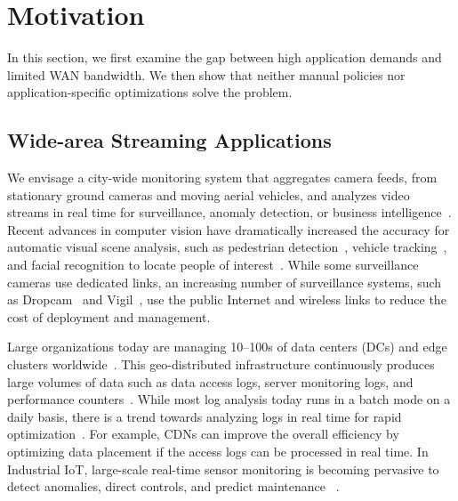 \section{Motivation}
\label{sec:motivation}

In this section, we first examine the gap between high application demands and
limited WAN bandwidth. We then show that neither manual policies nor
application-specific optimizations solve the problem.

\subsection{Wide-area Streaming Applications}
\label{sec:wide-area-streaming}

 We envisage a city-wide monitoring system that
aggregates camera feeds, from stationary ground cameras and moving aerial
vehicles, and analyzes video streams in real time for surveillance, anomaly
detection, or business intelligence~\cite{oh2011large}. Recent advances in
computer vision have dramatically increased the accuracy for automatic visual
scene analysis, such as pedestrian detection~\cite{dollar2012pedestrian},
vehicle tracking~\cite{coifman1998real}, and facial recognition to locate people
of interest~\cite{Lu:2015:SHF:2888116.2888245, parkhi2015deep}. While some
surveillance cameras use dedicated links, an increasing number of surveillance
systems, such as Dropcam~\cite{dropcam} and Vigil~\cite{zhang2015design}, use
the public Internet and wireless links to reduce the cost of deployment and
management.


 Large organizations today are managing
10--100s of data centers (DCs) and edge clusters
worldwide~\cite{calder2013mapping}. This geo-distributed infrastructure
continuously produces large volumes of data such as data access logs, server
monitoring logs, and performance counters~\cite{alspaugh2014analyzing,
  pu2015low, vulimiri2015global}. While most log analysis today runs in a batch
mode on a daily basis, there is a trend towards analyzing logs in real time for
rapid optimization~\cite{rabkin2014aggregation}. For example, CDNs can improve
the overall efficiency by optimizing data placement if the access logs can be
processed in real time. In Industrial IoT, large-scale real-time sensor
monitoring is becoming pervasive to detect anomalies, direct controls, and
predict maintenance ~\cite{balani2016enterprise, ge}.

